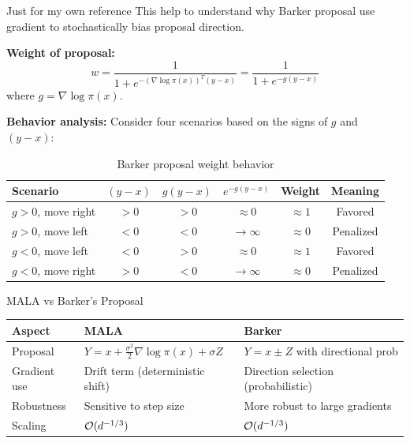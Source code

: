 \begin{frame}{Just for my own reference}
This help to understand why Barker proposal use gradient to 
stochastically bias proposal direction.

	\textbf{Weight of proposal:}
	$$w = \frac{1}{1 + e^{-(\nabla\log\pi(x))^T(y-x)}} = \frac{1}{1 + e^{-g(y-x)}}$$
	where $g = \nabla\log\pi(x)$.

	\textbf{Behavior analysis:} Consider four scenarios based on the signs of $g$ and $(y-x)$:
\begin{table}[h]
\centering
\begin{tabular}{lccccc}
\toprule
\textbf{Scenario} & $(y-x)$ & $g(y-x)$ & $e^{-g(y-x)}$ & \textbf{Weight} & \textbf{Meaning} \\
\midrule
$g>0$, move right & $>0$ & $>0$ & $\approx 0$ & $\approx 1$ & Favored \\
$g>0$, move left & $<0$ & $<0$ & $\to \infty$ & $\approx 0$ & Penalized \\
$g<0$, move left & $<0$ & $>0$ & $\approx 0$ & $\approx 1$ & Favored \\
$g<0$, move right & $>0$ & $<0$ & $\to \infty$ & $\approx 0$ & Penalized \\
\bottomrule
\end{tabular}
\caption{Barker proposal weight behavior}
\label{tab:barker}
\end{table}
\end{frame}


\begin{frame}{MALA vs Barker's Proposal}
\begin{table}[h]
\centering
\begin{tabular}{lll}
\toprule
\textbf{Aspect} & \textbf{MALA} & \textbf{Barker} \\
\midrule
Proposal & $Y = x + \frac{\sigma^2}{2}\nabla\log\pi(x) + \sigma Z$ & $Y = x \pm Z$ with directional prob \\
Gradient use & Drift term (deterministic shift) & Direction selection (probabilistic) \\
Robustness & Sensitive to step size & More robust to large gradients \\
Scaling & $\mathcal{O}(d^{-1/3})$ & $\mathcal{O}(d^{-1/3})$ \\
\bottomrule
\end{tabular}


\end{table}
	
\end{frame}

